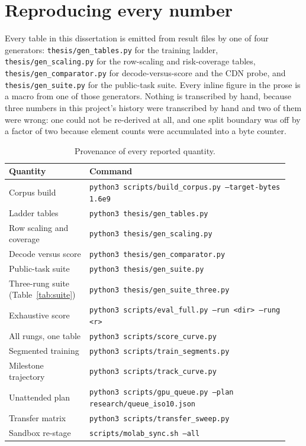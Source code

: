 \chapter{Reproducing every number}
\label{app:protocol}

Every table in this dissertation is emitted from result files by one of four
generators: \texttt{thesis/gen\_tables.py} for the training ladder,
\texttt{thesis/gen\_scaling.py} for the row-scaling and risk-coverage tables,
\texttt{thesis/gen\_comparator.py} for decode-versus-score and the CDN probe, and
\texttt{thesis/gen\_suite.py} for the public-task suite. Every inline figure in the
prose is a macro from one of those generators. Nothing is transcribed by hand,
because three numbers in this project's history were transcribed by hand and two
of them were wrong: one could not be re-derived at all, and one split boundary was
off by a factor of two because element counts were accumulated into a byte counter.

\begin{table}[htbp]
\centering
\footnotesize
\caption{Provenance of every reported quantity.}
\begin{tabular}{@{}p{0.27\linewidth}p{0.67\linewidth}@{}}
\toprule
Quantity & Command \\
\midrule
Corpus build & \texttt{python3 scripts/build\_corpus.py --target-bytes 1.6e9} \\
Ladder tables & \texttt{python3 thesis/gen\_tables.py} \\
Row scaling and coverage & \texttt{python3 thesis/gen\_scaling.py} \\
Decode versus score & \texttt{python3 thesis/gen\_comparator.py} \\
Public-task suite & \texttt{python3 thesis/gen\_suite.py} \\
Three-rung suite (Table~\ref{tab:suite}) & \texttt{python3 thesis/gen\_suite\_three.py} \\
Exhaustive score & \texttt{python3 scripts/eval\_full.py --run <dir> --rung <r>} \\
All rungs, one table & \texttt{python3 scripts/score\_curve.py} \\
Segmented training & \texttt{python3 scripts/train\_segments.py} \\
Milestone trajectory & \texttt{python3 scripts/track\_curve.py} \\
Unattended plan & \texttt{python3 scripts/gpu\_queue.py --plan research/queue\_iso10.json} \\
Transfer matrix & \texttt{python3 scripts/transfer\_sweep.py} \\
Sandbox re-stage & \texttt{scripts/molab\_sync.sh --all} \\
\bottomrule
\end{tabular}
\end{table}

